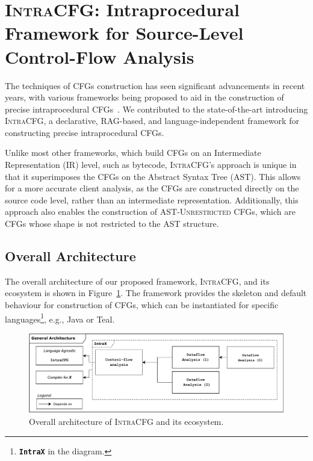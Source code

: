 \section{\textsc{IntraCFG}: Intraprocedural Framework for Source-Level Control-Flow Analysis}
The techniques of CFGs construction has seen significant advancements
in recent years, with various frameworks being proposed to aid in the construction 
of precise intraprocedural CFGs~\cite{smits2020flowspec,10.1016/j.scico.2012.02.002}.
We contributed to the state-of-the-art introducing \textsc{IntraCFG}, a declarative, RAG-based,
and language-independent framework for constructing precise intraprocedural CFGs.

Unlike most other frameworks, which build CFGs on an Intermediate Representation (IR) level,
such as bytecode, \textsc{IntraCFG}'s approach is unique in that it superimposes the CFGs 
on the Abstract Syntax Tree (AST). This allows for a more accurate client analysis,
as the CFGs are constructed directly on the source code level, rather than an
intermediate representation. Additionally, this approach also enables the construction 
of \textsc{AST-Unrestricted} CFGs, which are CFGs whose shape is not restricted to the AST structure.
\subsection{Overall Architecture}
The overall architecture of our proposed framework, \textsc{IntraCFG}, and its
ecosystem is shown in Figure~\ref{fig:intraCFG}. 
The framework provides the skeleton and default behaviour for construction of CFGs,
which can be instantiated for specific languages\footnote{\textbf{\texttt{IntraX}} in the diagram.}, e.g., Java or Teal. 
\begin{figure}[H]
	\centering
	\includegraphics[scale=0.7]{kappa/img/architecture.pdf}
	\caption{\label{fig:intraCFG} Overall architecture of \textsc{IntraCFG} and its ecosystem.}
\end{figure}


